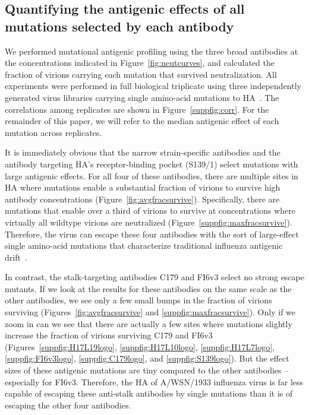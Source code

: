 \documentclass[11pt]{article}
\begin{document}
\subsection*{Quantifying the antigenic effects of all mutations selected by each antibody}
We performed mutational antigenic profiling using the three broad antibodies at the concentrations indicated in Figure~\ref{fig:neutcurves}, and calculated the fraction of virions carrying each mutation that survived neutralization. 
All experiments were performed in full biological triplicate using three independently generated virus libraries carrying single amino-acid mutations to HA~\citep{doud2016accurate}.
The correlations among replicates are shown in Figure~\ref{suppfig:corr}.
For the remainder of this paper, we will refer to the median antigenic effect of each mutation across replicates.

It is immediately obvious that the narrow strain-specific antibodies and the antibody targeting HA's receptor-binding pocket (S139/1) select mutations with large antigenic effects.
For all four of these antibodies, there are multiple sites in HA where mutations enable a substantial fraction of virions to survive high antibody concentrations (Figure~\ref{fig:avgfracsurvive}).
Specifically, there are mutations that enable over a third of virions to survive at concentrations where virtually all wildtype virions are neutralized (Figure~\ref{suppfig:maxfracsurvive}).
Therefore, the virus can escape these four antibodies with the sort of large-effect single amino-acid mutations that characterize traditional influenza antigenic drift~\citep{yewdell1979antigenic,webster1980determination,koel2013substitutions,chambers2015identification,petrie2016antibodies,neher2016prediction}.  

In contrast, the stalk-targeting antibodies C179 and FI6v3 select no strong escape mutants. 
If we look at the results for these antibodies on the same scale as the other antibodies, we see only a few small bumps in the fraction of virions surviving (Figures~\ref{fig:avgfracsurvive} and \ref{suppfig:maxfracsurvive}).
Only if we zoom in can we see that there are actually a few sites where mutations slightly increase the fraction of virions surviving C179 and FI6v3 (Figures~\ref{suppfig:H17L19logo}, \ref{suppfig:H17L10logo}, \ref{suppfig:H17L7logo}, \ref{suppfig:FI6v3logo}, \ref{suppfig:C179logo}, and \ref{suppfig:S139logo}).
But the effect sizes of these antigenic mutations are tiny compared to the other antibodies -- especially for FI6v3.
Therefore, the HA of A/WSN/1933 influenza virus is far less capable of escaping these anti-stalk antibodies by single mutations than it is of escaping the other four antibodies. 
\end{document}
